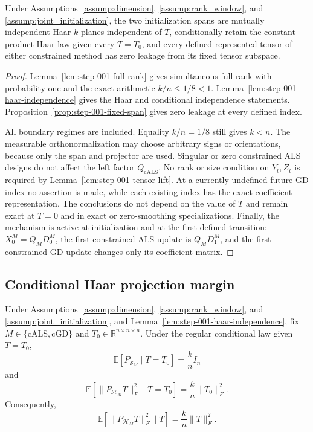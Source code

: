 \begin{proposition}\label{prop:step-001-certificate}
Under Assumptions~\ref{assump:dimension}, \ref{assump:rank_window}, and
\ref{assump:joint_initialization}, the two initialization spans are mutually
independent Haar $k$-planes independent of $T$, conditionally retain the
constant product-Haar law given every $T=T_0$, and every defined represented
tensor of either constrained method has zero leakage from its fixed tensor
subspace.
\end{proposition}

\begin{proof}
Lemma~\ref{lem:step-001-full-rank} gives simultaneous full rank with
probability one and the exact arithmetic $k/n\le1/8<1$.
Lemma~\ref{lem:step-001-haar-independence} gives the Haar and conditional
independence statements.  Proposition~\ref{prop:step-001-fixed-span} gives
zero leakage at every defined index.

All boundary regimes are included.  Equality $k/n=1/8$ still gives $k<n$.
The measurable orthonormalization may choose arbitrary signs or orientations,
because only the span and projector are used.  Singular or zero constrained
ALS designs do not affect the left factor $Q_{\mathrm{cALS}}$.  No rank or
size condition on $Y_t,Z_t$ is required by
Lemma~\ref{lem:step-001-tensor-lift}.  At a currently undefined future GD
index no assertion is made, while each existing index has the exact
coefficient representation.  The conclusions do not depend on the value of
$T$ and remain exact at $T=0$ and in exact or zero-smoothing specializations.
Finally, the mechanism is active at initialization and at the first defined
transition: $X_0^M=Q_MD_0^M$, the first constrained ALS update is
$Q_MD_1^M$, and the first constrained GD update changes only its coefficient
matrix.
\end{proof}

\subsection{Conditional Haar projection margin}\label{app:step-002}

\begin{lemma}\label{lem:step-002-projector-energy}
Under Assumptions~\ref{assump:dimension}, \ref{assump:rank_window}, and
\ref{assump:joint_initialization}, and Lemma~\ref{lem:step-001-haar-independence},
fix $M\in\{\mathrm{cALS},\mathrm{cGD}\}$ and
$T_0\in\mathbb R^{n\times n\times n}$.  Under the regular conditional law
given $T=T_0$,
\[
 \mathbb E[P_{\mathcal S_M}\mid T=T_0]=\frac{k}{n}I_n
\]
and
\[
 \mathbb E\!\left[\|P_{\mathcal H_M}T\|_F^2\mid T=T_0\right]
 =\frac{k}{n}\|T_0\|_F^2.
\]
Consequently,
\[
 \mathbb E\!\left[\|P_{\mathcal H_M}T\|_F^2\mid T\right]
 =\frac{k}{n}\|T\|_F^2.
\]
\end{lemma}

